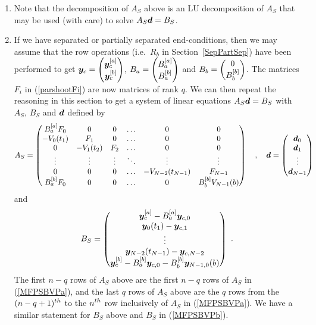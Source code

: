 \begin{rmkList}
\begin{enumerate}
Thus $A_S$ is invertible if and only if $Q$ is invertible.
\item Note that the decomposition of $A_S$ above is an LU
decomposition of $A_S$ that may be used (with care) to solve
$A_S \bm{d} = B_S$.
\item If we have separated or partially separated end-conditions, then
we may assume that the row operations (i.e.\ $R_b$ in
Section~\ref{SepPartSep}) have been performed to get
$\displaystyle \bm{y}_c = \begin{pmatrix} \bm{y}_c^{[a]} \\ \bm{y}_c^{[b]}
\end{pmatrix}$, 
$\displaystyle B_a = \begin{pmatrix} B_a^{[a]} \\ B_a^{[b]}\end{pmatrix}$ and
$\displaystyle B_b = \begin{pmatrix} 0 \\ B_b^{[b]} \end{pmatrix}$.
The matrices $F_i$ in (\ref{parshootFi}) are now 
matrices of rank $q$.  We can then repeat the reasoning in this
section to get a system of linear equations $A_S \bm{d} = B_S$ with $A_S$,
$B_S$ and $\bm{d}$ defined by
\[
A_S = \begin{pmatrix}
B_a^{[a]} F_0 & 0 & 0 & \ldots & 0 & 0 \\
-V_0(t_1) & F_1 & 0 & \ldots & 0 & 0 \\
0 & -V_1(t_2) & F_2 & \ldots & 0 & 0 \\
\vdots & \vdots & \vdots & \ddots & \vdots & \vdots \\
0 & 0 & 0 & \ldots & -V_{N-2}(t_{N-1}) & F_{N-1} \\
B_a^{[b]} F_0 & 0 & 0 & \ldots & 0 & B_b^{[b]} V_{N-1}(b)
\end{pmatrix}
\quad , \quad
\bm{d} = \begin{pmatrix} \bm{d}_0 \\ \bm{d}_1 \\ \vdots \\
\bm{d}_{N-1} \end{pmatrix}
\]
and
\[
B_S = \begin{pmatrix}
\bm{y}_c^{[a]} - B_a^{[a]} \bm{y}_{c,0} \\
\bm{y}_0(t_1) - \bm{y}_{c,1} \\
\vdots \\
\bm{y}_{N-2}(t_{N-1}) - \bm{y}_{c,N-2}\\
\bm{y}_{c}^{[b]} - B_a^{[b]} \bm{y}_{c,0} - B_b^{[b]} \bm{y}_{N-1,0}(b)
\end{pmatrix} \ .
\]
The first $n-q$ rows of $A_S$ above are the first $n-q$ rows of $A_S$
in (\ref{MFPSBVPa}), and the last $q$ rows of $A_S$ above are
the $q$ rows from the $\displaystyle (n-q+1)^{th}$ to the
$\displaystyle n^{th}$ row inclusively
of $A_S$ in (\ref{MFPSBVPa}).  We have a similar statement for $B_S$
above and $B_S$ in (\ref{MFPSBVPb}).


\end{enumerate}
\end{rmkList}
